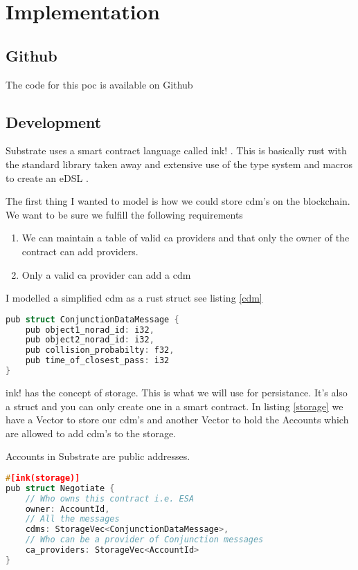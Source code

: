 \chapter{Implementation}

\section{Github}

The code for this \gls{poc} is available on Github \cite{github}

\section{Development}

Substrate uses a smart contract language called ink! \cite{ink}. This is basically rust with the standard
library taken away and extensive use of the type system and macros to create an eDSL \cite{edsl}.

The first thing I wanted to model is how we could store \gls{cdm}'s on the blockchain.
We want to be sure we fulfill the following requirements

\begin{enumerate}
    \item We can maintain a table of valid \acrshort{ca} providers and that only the owner of the contract can add 
        providers.
    \item Only a valid \acrshort{ca} provider can add a \gls{cdm}
\end{enumerate}

I modelled a simplified \gls{cdm} as a rust struct see listing \ref{cdm}

\begin{lstlisting}[label={cdm},language=c,caption={CDM Struct}]
pub struct ConjunctionDataMessage {
    pub object1_norad_id: i32,
    pub object2_norad_id: i32,
    pub collision_probabilty: f32,
    pub time_of_closest_pass: i32
}
\end{lstlisting}

ink! \cite{ink} has the concept of storage. This is what we will use for persistance. It's also a struct and you can only create one
in a smart contract. In listing \ref{storage} we have a Vector to store our \gls{cdm}'s and another Vector
to hold the Accounts which are allowed to add \gls{cdm}'s to the storage.


Accounts in Substrate are public addresses. 

\begin{lstlisting}[label={storage},language=c,caption={ink! storage}]
#[ink(storage)]
pub struct Negotiate {
    // Who owns this contract i.e. ESA
    owner: AccountId,
    // All the messages
    cdms: StorageVec<ConjunctionDataMessage>,
    // Who can be a provider of Conjunction messages
    ca_providers: StorageVec<AccountId>
}
\end{lstlisting}

